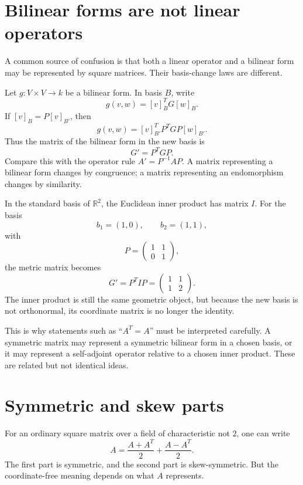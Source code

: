 \section{Bilinear forms are not linear operators}

A common source of confusion is that both a linear operator and a bilinear form may be represented by square matrices.  Their basis-change laws are different.

Let \(g:V\times V\to k\) be a bilinear form.  In basis \(B\), write
\[
  g(v,w)=[v]_B^T G [w]_B.
\]
If \([v]_B=P[v]_{B'}\), then
\[
  g(v,w)=[v]_{B'}^T P^TGP [w]_{B'}.
\]
Thus the matrix of the bilinear form in the new basis is
\[
  G'=P^TGP.
\]
Compare this with the operator rule \(A'=P^{-1}AP\).  A matrix representing a bilinear form changes by congruence; a matrix representing an endomorphism changes by similarity.

\begin{example}
In the standard basis of \(\mathbb R^2\), the Euclidean inner product has matrix \(I\).  For the basis
\[
  b_1=(1,0),\qquad b_2=(1,1),
\]
with
\[
  P=
  \begin{pmatrix}
  1&1\\
  0&1
  \end{pmatrix},
\]
the metric matrix becomes
\[
  G'=P^TIP
  =
  \begin{pmatrix}
  1&1\\
  1&2
  \end{pmatrix}.
\]
The inner product is still the same geometric object, but because the new basis is not orthonormal, its coordinate matrix is no longer the identity.
\end{example}

This is why statements such as ``\(A^T=A\)'' must be interpreted carefully.  A symmetric matrix may represent a symmetric bilinear form in a chosen basis, or it may represent a self-adjoint operator relative to a chosen inner product.  These are related but not identical ideas.

\section{Symmetric and skew parts}

For an ordinary square matrix over a field of characteristic not \(2\), one can write
\[
  A=\frac{A+A^T}{2}+\frac{A-A^T}{2}.
\]
The first part is symmetric, and the second part is skew-symmetric.  But the coordinate-free meaning depends on what \(A\) represents.

